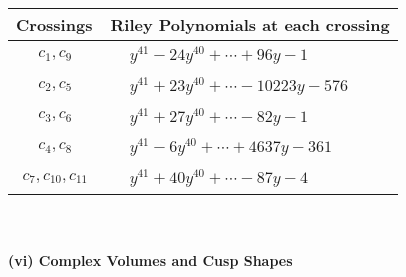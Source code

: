 \documentclass[1p]{elsarticle_modified}
\theoremstyle{definition}
\begin{document}
\begin{tabular}{m{50pt}|m{274pt}}
Crossings & \hspace{64pt}Riley Polynomials at each crossing \\
\hline $$\begin{aligned}c_{1},c_{9}\end{aligned}$$&$\begin{aligned}
&y^{41}-24 y^{40}+\cdots+96 y-1
\end{aligned}$\\
\hline $$\begin{aligned}c_{2},c_{5}\end{aligned}$$&$\begin{aligned}
&y^{41}+23 y^{40}+\cdots-10223 y-576
\end{aligned}$\\
\hline $$\begin{aligned}c_{3},c_{6}\end{aligned}$$&$\begin{aligned}
&y^{41}+27 y^{40}+\cdots-82 y-1
\end{aligned}$\\
\hline $$\begin{aligned}c_{4},c_{8}\end{aligned}$$&$\begin{aligned}
&y^{41}-6 y^{40}+\cdots+4637 y-361
\end{aligned}$\\
\hline $$\begin{aligned}c_{7},c_{10},c_{11}\end{aligned}$$&$\begin{aligned}
&y^{41}+40 y^{40}+\cdots-87 y-4
\end{aligned}$\\
\hline
\end{tabular}\\~\\
\newpage\flushleft \textbf{(vi) Complex Volumes and Cusp Shapes}
\end{document}
